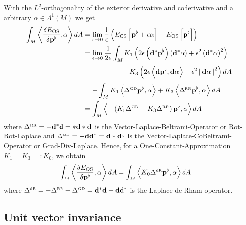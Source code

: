 \documentclass[a4paper,11pt]{scrartcl}
\newcommand{\exd}{\mathbf{d}}
\newcommand{\excod}{\exd^{*}} %
\newcommand{\M}{M}
\newcommand{\dA}{dA}
\newcommand{\pfl}{\mathbf{p}^{\flat}}
\newcommand{\EOS}{E_{\text{OS}}}
\newcommand{\LB}{\Delta^{\text{\tiny RR}}}
\newcommand{\LCB}{\Delta^{\text{\tiny GD}}}
\newcommand{\LDR}{\Delta^{\text{\tiny dR}}}
\begin{document}
  With the  \( L^{2} \)-orthogonality of the exterior derivative and coderivative and a arbitrary \( \alpha\in\Lambda^{1}(M) \) we get
  \begin{align}
    \int_{\M} \left\langle\frac{\delta\EOS}{\delta\pfl} , \alpha \right\rangle \dA
      &= \lim_{\epsilon\rightarrow 0} \frac{1}{\epsilon}\left( \EOS\left[ \pfl + \epsilon\alpha \right] - \EOS\left[ \pfl\right]\right) \\
      &=  \lim_{\epsilon\rightarrow 0} \frac{1}{2\epsilon} \int_{\M} 
                K_{1}\left( 2\epsilon \left( \excod\pfl \right)\left( \excod\alpha \right) 
                            + \epsilon^{2}\left( \excod\alpha \right)^{2} \right) \\
      &\phantom{= \lim_{\epsilon\rightarrow 0} \frac{1}{2\epsilon} \int_{\M}}
                +K_{3}\left(2\epsilon\left\langle \exd\pfl, \exd\alpha \right\rangle
                            + \epsilon^{2}\left\| \exd\alpha \right\|^{2}\right)\dA \\
      &= -\int_{\M} K_{1} \left\langle \LCB\pfl, \alpha \right\rangle + K_{3} \left\langle \LB\pfl, \alpha \right\rangle \dA \\
      &= \int_{\M} \left\langle -\left( K_{1}\LCB + K_{3}\LB\right)\pfl , \alpha \right\rangle \dA
  \end{align}
  where \( \LB = -\excod\exd = *\exd *\exd  \) is the Vector-Laplace-Beltrami-Operator or Rot-Rot-Laplace 
  and \( \LCB = - \exd\excod = \exd * \exd * \) is the Vector-Laplace-CoBeltrami-Operator or Grad-Div-Laplace.
  Hence, for a One-Constant-Approximation \( K_{1} = K_{3} =: K_{0} \), we obtain
  \begin{align}
    \int_{\M} \left\langle\frac{\delta\EOS}{\delta\pfl} , \alpha \right\rangle \dA
     &= \int_{\M} \left\langle K_{0}\LDR\pfl , \alpha \right\rangle \dA
  \end{align}
  where \( \LDR = -\LB - \LCB = \excod\exd + \exd\excod\) is the Laplace-de Rham operator.
  
  \subsection{Unit vector invariance}
  
\end{document}

